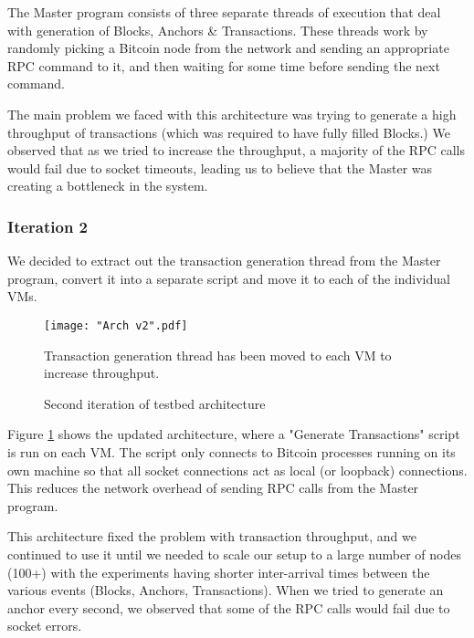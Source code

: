 The Master program consists of three separate threads of execution that deal with generation of Blocks, Anchors \& Transactions. 
These threads work by randomly picking a Bitcoin node from the network and sending an appropriate RPC command to it, and then waiting for some time before sending the next command.

The main problem we faced with this architecture was trying to generate a high throughput of transactions (which was required to have fully filled Blocks.) We observed that as we tried to increase the throughput, a majority of the RPC calls would fail due to socket timeouts, leading us to believe that the Master was creating a bottleneck in the system.


\subsubsection{Iteration 2} \label{impl-arch-2}

We decided to extract out the transaction generation thread from the Master program, convert it into a separate script and move it to each of the individual VMs. 

\begin{figure}[!htb]
    \centering
    \texttt{[image: "Arch v2".pdf]}
    \caption{Second iteration of testbed architecture}
    
    \medskip
    \footnotesize
    Transaction generation thread has been moved to each VM to increase throughput.
    \label{fig-impl-arch-2}
\end{figure}

Figure \ref{fig-impl-arch-2} shows the updated architecture, where a "Generate Transactions" script is run on each VM. The script only connects to Bitcoin processes running on its own machine so that all socket connections act as local (or loopback) connections. This reduces the network overhead of sending RPC calls from the Master program. 

This architecture fixed the problem with transaction throughput, and we continued to use it until we needed to scale our setup to a large number of nodes (100+) with the experiments having shorter inter-arrival times between the various events (Blocks, Anchors, Transactions). When we tried to generate an anchor every second, we observed that some of the RPC calls would fail due to socket errors.

